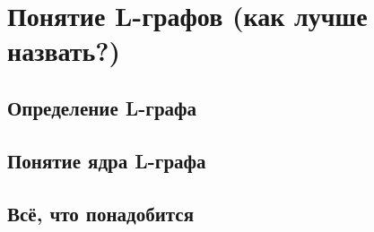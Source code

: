 \chapter{Понятие L-графов (как лучше назвать?)} \label{chapt2}

\section{Определение L-графа} %

\section{Понятие ядра L-графа} %

\section{Всё, что понадобится} %

\clearpage